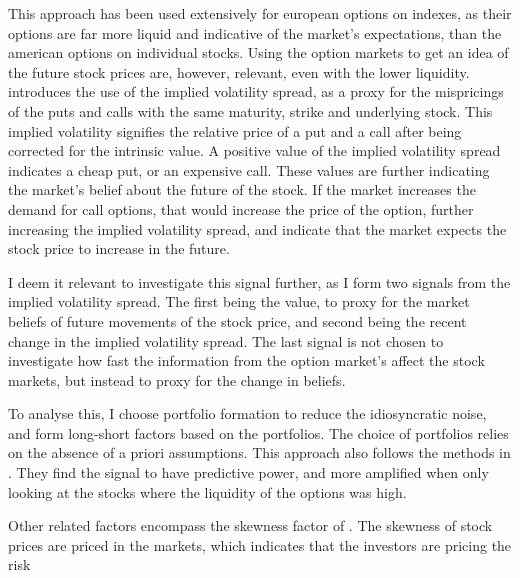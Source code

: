 This approach has been used extensively for european options on indexes, as their options are far more liquid and indicative of the market's expectations, than the american options on individual stocks. Using the option markets to get an idea of the future stock prices are, however, relevant, even with the lower liquidity. \cite{cremers2010deviations} introduces the use of the implied volatility spread, as a proxy for the mispricings of the puts and calls with the same maturity, strike and underlying stock. This implied volatility signifies the relative price of a put and a call after being corrected for the intrinsic value. A positive value of the implied volatility spread indicates a cheap put, or an expensive call. These values are further indicating the market's belief about the future of the stock. If the market increases the demand for call options,  that would increase the price of the option, further increasing the implied volatility spread, and indicate that the market expects the stock price to increase in the future.

I deem it relevant to investigate this signal further, as I form two signals from the implied volatility spread. The first being the value, to proxy for the market beliefs of future movements of the stock price, and second being the recent change in the implied volatility spread. The last signal is not chosen to investigate how fast the information from the option market's affect the stock markets, but instead to proxy for the change in beliefs. 

To analyse this, I choose portfolio formation to reduce the idiosyncratic noise, and form long-short factors based on the portfolios. The choice of portfolios relies on the absence of a priori assumptions. This approach also follows the methods in \cite{cremers2010deviations}. They find the signal to have predictive power, and more amplified when only looking at the stocks where the liquidity of the options was high.



Other related factors encompass the skewness factor of \cite{harvey2000time}. The skewness of stock prices are priced in the markets, which indicates that the investors are pricing the risk 



